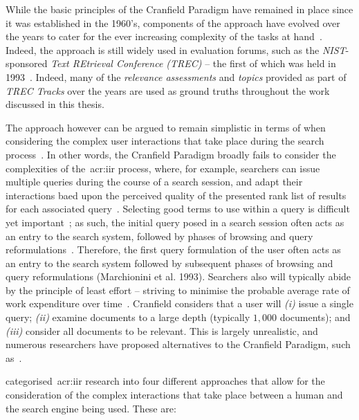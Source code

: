 While the basic principles of the Cranfield Paradigm have remained in place since it was established in the 1960's, components of the approach have evolved over the years to cater for the ever increasing complexity of the tasks at hand~\citep{harman2010cranfield}. Indeed, the approach is still widely used in evaluation forums, such as the \emph{NIST}-sponsored \emph{Text REtrieval Conference (TREC)} -- the first of which was held in 1993~\citep{harman1993trec1}. Indeed, many of the \emph{relevance assessments} and \emph{topics} provided as part of \emph{TREC Tracks} over the years are used as ground truths throughout the work discussed in this thesis.

The approach however can be argued to remain simplistic in terms of when considering the complex user interactions that take place during the search process~\citep{borlund2000evaluation_iir,ingwersen2005theturn}. In other words, the Cranfield Paradigm broadly fails to consider the complexities of the~\gls{acr:iir} process, where, for example, searchers can issue multiple queries during the course of a search session, and adapt their interactions baed upon the perceived quality of the presented rank list of results for each associated query~\citep{moffat2013users_versus_models}. Selecting good terms to use within a query is difficult yet important~\citep{efthimiadis2000query_expansion}; as such, the initial query posed in a search session often acts as an entry to the search system, followed by phases of browsing and query reformulations~\citep{marchionini1993information_seeking}. Therefore, the first query formulation of the user often acts as an entry to the search system followed by subsequent phases of browsing and query reformulations (Marchionini et al. 1993). Searchers also will typically abide by the principle of least effort -- striving to minimise the probable average rate of work expenditure over time~\citep{zipf1949behaviour}. Cranfield considers that a user will \emph{(i)} issue a single query; \emph{(ii)} examine documents to a large depth (typically $1,000$ documents); and \emph{(iii)} consider all documents to be relevant. This is largely unrealistic, and numerous researchers have proposed alternatives to the Cranfield Paradigm, such as~\citealp{borlund2003iir_model}.

\citealp{keskustalo2008user_simulation} categorised~\gls{acr:iir} research into four different approaches that allow for the consideration of the complex interactions that take place between a human and the search engine being used. These are:

